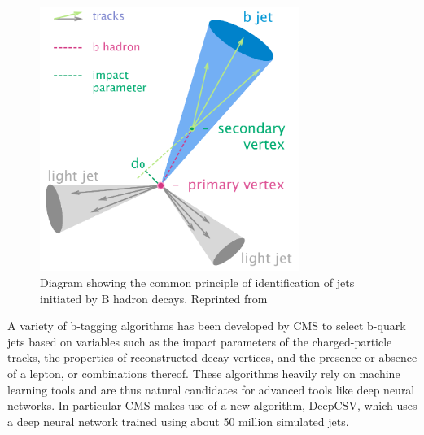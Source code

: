 \begin{figure}[h]
  	\label{fig:antikt}
 	\centering
 	\includegraphics[width=0.75\textwidth]{figures/Btag.png}
 	\singlespace
 	\caption{Diagram showing the common principle of identification of jets initiated by B hadron decays. Reprinted from \cite{wiki:btag}}
 \end{figure}

A variety of b-tagging algorithms has been developed by CMS to select b-quark jets\cite{BTV-12-001} based on variables such as the impact parameters of the charged-particle tracks, the properties of reconstructed decay vertices, and the presence or absence of a lepton, or combinations thereof. These algorithms heavily rely on machine learning tools and are thus natural candidates for advanced tools like deep neural networks. In particular CMS makes use of a new algorithm, DeepCSV\cite{Sirunyan_2018, PhysRevD.94.112002}, which uses a deep neural network trained using about 50 million simulated jets. 

